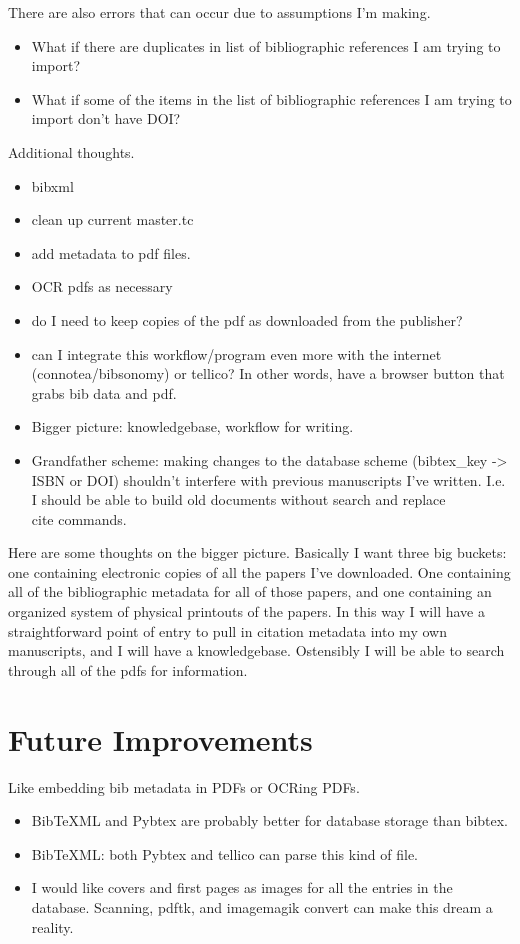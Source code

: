 \documentclass[letterpaper,12pt]{article}
\begin{document}
There are also errors that can occur due to assumptions I'm making.

\begin{itemize}
\item What if there are duplicates in list of bibliographic references I am trying to import?
\item What if some of the items in the list of bibliographic references I am trying to import don't have DOI?
\end{itemize}

Additional thoughts.

\begin{itemize}
\item bibxml
\item clean up current master.tc
\item add metadata to pdf files.
\item OCR pdfs as necessary
\item do I need to keep copies of the pdf as downloaded from the publisher?
\item can I integrate this workflow/program even more with the internet (connotea/bibsonomy) or tellico? In other words, have a browser button that grabs bib data and pdf.
\item Bigger picture: knowledgebase, workflow for writing.
\item Grandfather scheme: making changes to the database scheme (bibtex\_key -> ISBN or DOI) shouldn't interfere with previous manuscripts I've written. I.e. I should be able to build old documents without search and replace \\cite commands.
\end{itemize}

Here are some thoughts on the bigger picture. Basically I want three big buckets: one containing electronic copies of all the papers I've downloaded. One containing all of the bibliographic metadata for all of those papers, and one containing an organized system of physical printouts of the papers. In this way I will have a straightforward point of entry to pull in citation metadata into my own manuscripts, and I will have a knowledgebase. Ostensibly I will be able to search through all of the pdfs for information.






\section{Future Improvements}
Like embedding bib metadata in PDFs or OCRing PDFs.

\begin{itemize}
\item BibTeXML and Pybtex are probably better for database storage than bibtex.
\item BibTeXML: both Pybtex and tellico can parse this kind of file.
\item I would like covers and first pages as images for all the entries in the database. Scanning, pdftk, and imagemagik convert can make this dream a reality.
\end{itemize}
\end{document}
